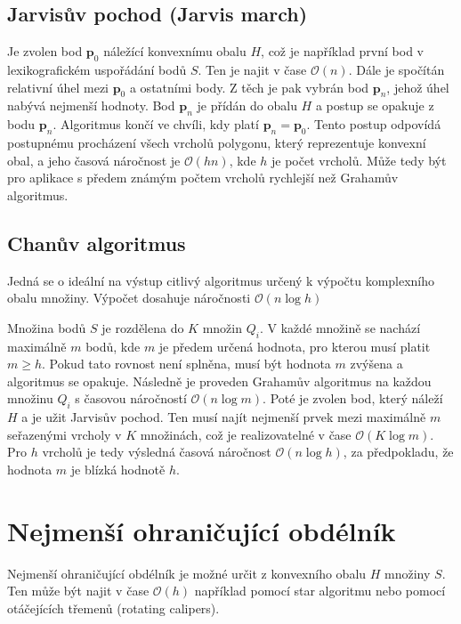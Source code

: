 \documentclass[twoside]{ctuthesis}
\begin{document}
\subsection{Jarvisův pochod (Jarvis march)}
Je zvolen bod $\mathbf{p}_0$ náležící konvexnímu obalu $H$, což je například první bod v lexikografickém uspořádání bodů $S$. Ten je najit v čase $\mathcal{O}(n)$. Dále je spočítán relativní úhel mezi $\mathbf{p}_0$ a ostatními body. Z těch je pak vybrán bod $\mathbf{p}_n$, jehož úhel nabývá nejmenší hodnoty. Bod $\mathbf{p}_n$ je přídán do obalu $H$ a postup se opakuje z bodu $\mathbf{p}_n$. Algoritmus končí ve chvíli, kdy platí $\mathbf{p}_n = \mathbf{p}_0$. Tento postup odpovídá postupnému procházení všech vrcholů polygonu, který reprezentuje konvexní obal, a jeho časová náročnost je $\mathcal{O}(hn)$, kde $h$ je počet vrcholů. Může tedy být pro aplikace s předem známým počtem vrcholů rychlejší než Grahamův algoritmus.

\subsection{Chanův algoritmus}
Jedná se o ideální na výstup citlivý algoritmus určený k výpočtu komplexního obalu množiny. Výpočet dosahuje náročnosti $\mathcal{O}(n\log h)$ 

Množina bodů  $S$ je rozdělena do $K$ množin $Q_i$. V každé množině se nachází maximálně $m$ bodů, kde $m$ je předem určená hodnota, pro kterou musí platit $m \geq h$. Pokud tato rovnost není splněna, musí být hodnota $m$ zvýšena a algoritmus se opakuje. Následně je proveden Grahamův algoritmus na každou množinu $Q_i$ s časovou náročností $\mathcal{O}(n\log m)$. Poté je zvolen bod, který náleží $H$ a je užit Jarvisův pochod. Ten musí najít nejmenší prvek mezi maximálně $m$ seřazenými vrcholy v $K$ množinách, což je realizovatelné v čase $\mathcal{O}(K \log m)$. Pro $h$ vrcholů je tedy výsledná časová náročnost $\mathcal{O}(n \log h)$, za předpokladu, že hodnota $m$ je blízká hodnotě $h$.\cite{chan1996optimal}

\section{Nejmenší ohraničující obdélník}
Nejmenší ohraničující obdélník je možné určit z konvexního obalu $H$ množiny $S$. Ten může být najit v čase $\mathcal{O}(h)$ například pomocí star algoritmu \cite{toussaint1984complexity} nebo pomocí otáčejících třemenů (rotating calipers).
\end{document}
